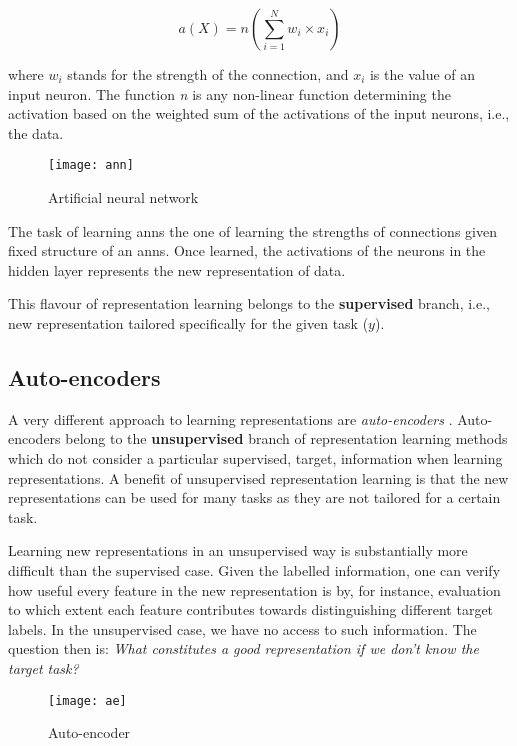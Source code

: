 \begin{equation}
	a(X) = n(\sum_{i=1}^N w_i \times x_i)
\end{equation} 

where $w_i$ stands for the strength of the connection, and $x_i$ is the value of an input neuron.
The function \textit{n} is any non-linear function determining the activation based on the weighted sum of the activations of the input neurons, i.e., the data.




\begin{figure}
	\centering
	\texttt{[image: ann]}
	\caption{Artificial neural network}
	\label{fig:ann}
\end{figure}


The task of learning \gls{ann}s the one of learning the strengths of connections given fixed structure of an \gls{ann}s.
Once learned, the activations of the neurons in the hidden layer represents the new representation of data.


This flavour of representation learning belongs to the \textbf{supervised} branch, i.e.,  new representation tailored specifically for the given task ($y$).




\subsection{Auto-encoders}


A very different approach to learning representations are \textit{auto-encoders} \cite{Hinton504}.
Auto-encoders belong to the \textbf{unsupervised} branch of representation learning methods which do not consider a particular supervised, target, information when learning representations.
A benefit of unsupervised representation learning is that the new representations can be used for many tasks as they are not tailored for a certain task.


Learning new representations in an unsupervised way is substantially more difficult than the supervised case.
Given the labelled information, one can verify how useful every feature in the new representation is  by, for instance, evaluation to which extent each feature contributes towards distinguishing different target labels.
In the unsupervised case, we have no access to such information.
The question then is: \textit{What constitutes a good representation if we don't know the target task?}


\begin{figure}
	\centering
	\texttt{[image: ae]}
	\caption{Auto-encoder}
	\label{fig:ae}
\end{figure}



